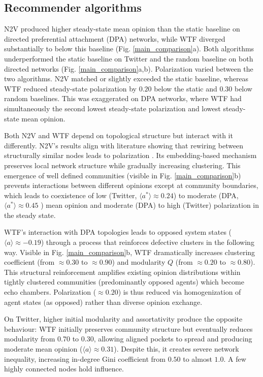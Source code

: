 \documentclass[unnumsec,webpdf,contemporary,large]{oup-authoring-template}%
\theoremstyle{thmstyleone}%
\theoremstyle{thmstyletwo}%
\theoremstyle{thmstylethree}%
\begin{document}
\subsection{Recommender algorithms}\label{sec:recommenders}

N2V produced higher steady-state mean opinion than the static baseline on directed preferential attachment (DPA) networks, while WTF diverged substantially to below this baseline (Fig. \ref{main_comparison}a). Both algorithms underperformed the static baseline on Twitter and the random baseline on both directed networks (Fig. \ref{main_comparison}a,b). Polarization varied between the two algorithms. N2V matched or slightly exceeded the static baseline, whereas WTF reduced steady-state polarization by $0.20$ below the static and $0.30$ below random baselines. This was exaggerated on DPA networks, where WTF had simultaneously the second lowest steady-state polarization and lowest steady-state mean opinion.

Both N2V and WTF depend on topological structure but interact with it differently. N2V's results align with literature showing that rewiring between structurally similar nodes leads to polarization \cite{santos_link_2021}. Its embedding-based mechanism preserves local network structure while gradually increasing clustering. This emergence of well defined communities (visible in Fig. \ref{main_comparison}b) prevents interactions between different opinions except at community boundaries, which leads to coexistence of low (Twitter, $\langle a^*\rangle \approx 0.24$) to moderate (DPA, $\langle a^* \rangle \approx 0.45$ ) mean opinion and moderate (DPA) to high (Twitter) polarization in the steady state.


WTF's interaction with DPA topologies leads to opposed system states ($\langle a \rangle \approx -0.19$) through a process that reinforces defective clusters in the following way. Visible in Fig. \ref{main_comparison}b, WTF dramatically increases clustering coefficient (from $\approx 0.30$ to $\approx 0.90$) and modularity $Q$ (from $\approx 0.20$ to $\approx 0.80$). This structural reinforcement amplifies existing opinion distributions within tightly clustered communities (predominantly opposed agents) which become echo chambers. Polarization ($\approx 0.20$) is thus reduced via homogenization of agent states (as opposed) rather than diverse opinion exchange.

On Twitter, higher initial modularity and assortativity produce the opposite behaviour: WTF initially preserves community structure but eventually reduces modularity from 0.70 to 0.30, allowing aligned pockets to spread and producing moderate mean opinion ($\langle  a \rangle  \approx0.31$). Despite this, it creates severe network inequality, increasing in-degree Gini coefficient from $0.50$ to almost $1.0$. A few highly connected nodes hold influence.
\end{document}
